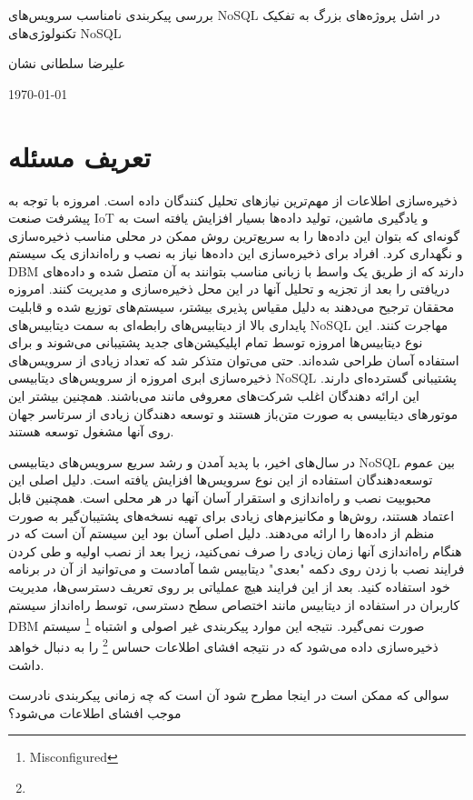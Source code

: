 \documentclass[10pt, a4paper]{article}
\begin{document}
\centerline{بررسی پیکربندی نامناسب سرویس‌های NoSQL در اشل پروژه‌های بزرگ به
تفکیک تکنولوژی‌های NoSQL}
\centerline{علیرضا سلطانی نشان}
\centerline{\today}
\tableofcontents

\newpage

\section{تعریف مسئله}

ذخیره‌سازی اطلاعات از مهم‌ترین نیاز‌های تحلیل کنندگان داده است. امروزه با توجه
به پیشرفت صنعت IoT و یادگیری ماشین، تولید داده‌ها بسیار افزایش یافته است به
گونه‌ای که بتوان این داده‌ها را به سریع‌ترین روش ممکن در محلی مناسب ذخیره‌سازی و
نگهداری کرد.  افراد برای ذخیره‌سازی این داده‌ها نیاز به نصب و راه‌اندازی یک
سیستم DBM دارند که از طریق یک واسط با زبانی مناسب بتوانند به آن متصل شده و
داده‌های دریافتی را بعد از تجزیه و تحلیل آنها در این محل ذخیره‌سازی و مدیریت
کنند. امروزه محققان ترجیح می‌دهند به دلیل مقیاس پذیری بیشتر، سیستم‌های توزیع شده
و قابلیت پایداری بالا از دیتابیس‌های رابطه‌ای به سمت دیتابیس‌های NoSQL مهاجرت
کنند.  این نوع دیتابیس‌ها امروزه توسط تمام اپلیکیشن‌های جدید پشتیبانی می‌شوند و
برای استفاده آسان طراحی شده‌اند. حتی می‌توان متذکر شد که تعداد زیادی از
سرویس‌های ذخیره‌سازی ابری امروزه‌ از سرویس‌های دیتابیسی NoSQL پشتیبانی گسترده‌ای
دارند. این ارائه دهندگان اغلب شرکت‌های معروفی مانند 
  می‌باشند. همچنین بیشتر این
موتور‌های دیتابیسی به صورت متن‌باز هستند و توسعه دهندگان زیادی از سرتاسر جهان
روی آنها مشغول توسعه هستند.

در سال‌های اخیر، با پدید آمدن و رشد سریع سرویس‌های دیتابیسی NoSQL بین عموم
توسعه‌دهندگان استفاده از این نوع سرویس‌ها افزایش یافته است. دلیل اصلی این
محبوبیت نصب و راه‌اندازی و استقرار آسان آنها در هر محلی است. همچنین قابل اعتماد
هستند، روش‌ها و مکانیزم‌های زیادی برای تهیه نسخه‌های پشتیبان‌گیر به صورت منظم از
داده‌ها را ارائه می‌دهند. دلیل اصلی آسان بود این سیستم آن است که در هنگام
راه‌اندازی آنها زمان زیادی را صرف نمی‌کنید، زیرا بعد از نصب اولیه و طی کردن
فرایند نصب با زدن روی دکمه "بعدی" دیتابیس شما آمادست و می‌توانید از آن در برنامه
خود استفاده کنید. بعد از این فرایند هیچ عملیاتی بر روی تعریف دسترسی‌ها، مدیریت
کاربران در استفاده از دیتابیس مانند اختصاص سطح دسترسی، توسط راه‌انداز سیستم DBM
صورت نمی‌گیرد. نتیجه این موارد پیکربندی غیر اصولی و اشتباه
\footnote{Misconfigured} سیستم ذخیره‌سازی داده می‌شود که در نتیجه افشای اطلاعات
حساس \footnote{} را به دنبال خواهد داشت.

سوالی که ممکن است در اینجا مطرح شود آن است که چه زمانی پیکربندی نادرست موجب
افشای اطلاعات می‌شود؟
\end{document}
